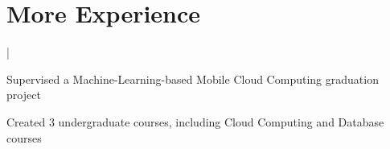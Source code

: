 \vspace{2\topsep} %
\section{More Experience}
 |
\begin{tightemize}
\item{Supervised a Machine-Learning-based Mobile Cloud Computing graduation project}
\item{Created 3 undergraduate courses, including Cloud Computing and Database courses}
\end{tightemize}
\sectionsep




